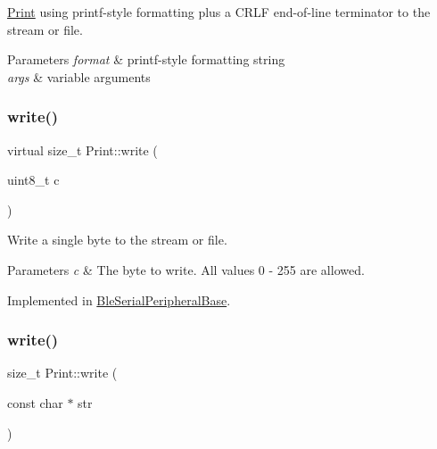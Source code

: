 \mbox{\hyperlink{class_print}{Print}} using printf-\/style formatting plus a C\+R\+LF end-\/of-\/line terminator to the stream or file. 


\begin{DoxyParams}{Parameters}
{\em format} & printf-\/style formatting string\\
\hline
{\em args} & variable arguments \\
\hline
\end{DoxyParams}
\mbox{\label{class_print_ab9195b97274029f693aaddce6c7a0021}} 
\subsubsection{\texorpdfstring{write()}{write()}\hspace{0.1cm}{\footnotesize\ttfamily [1/3]}}
{\footnotesize\ttfamily virtual size\+\_\+t Print\+::write (\begin{DoxyParamCaption}\item[{uint8\+\_\+t}]{c }\end{DoxyParamCaption})\hspace{0.3cm}{\ttfamily [pure virtual]}}



Write a single byte to the stream or file. 


\begin{DoxyParams}{Parameters}
{\em c} & The byte to write. All values 0 -\/ 255 are allowed. \\
\hline
\end{DoxyParams}


Implemented in \mbox{\hyperlink{class_ble_serial_peripheral_base_ac041322685f26d921f60d01a2ed99e83}{Ble\+Serial\+Peripheral\+Base}}.

\mbox{\label{class_print_a5b40e0e9cab1f2fe5bb0cb22ffe5adda}} 
\subsubsection{\texorpdfstring{write()}{write()}\hspace{0.1cm}{\footnotesize\ttfamily [2/3]}}
{\footnotesize\ttfamily size\+\_\+t Print\+::write (\begin{DoxyParamCaption}\item[{const char $\ast$}]{str }\end{DoxyParamCaption})\hspace{0.3cm}{\ttfamily [inline]}}



